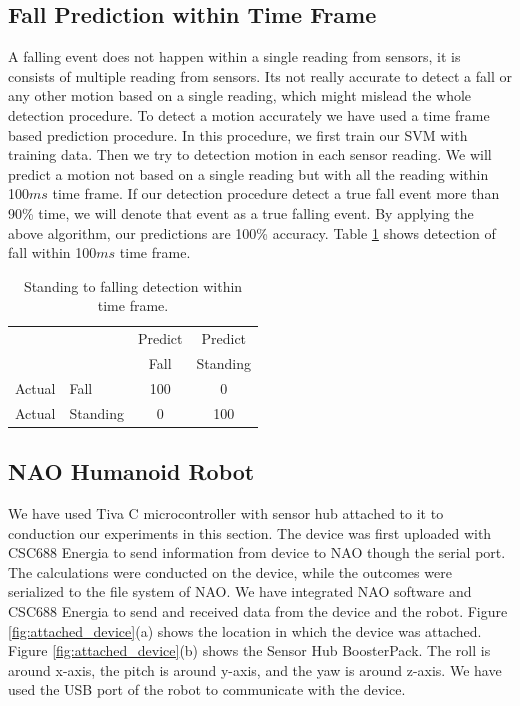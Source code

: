\documentclass[letterpaper]{article}
\begin{document}
\subsection*{Fall Prediction within Time Frame}

A falling event does not happen within a single reading from sensors, it is consists of multiple
reading from sensors.  Its not really accurate to detect a fall or any other motion based on a
single reading, which might mislead the whole detection procedure. To detect a motion accurately we
have used a time frame based prediction procedure. In this procedure, we first train our SVM with
training data. Then we try to detection motion in each sensor reading. We will predict a motion not
based on a single reading but with all the reading within 100$ms$ time frame. If our detection
procedure detect a true fall event more than 90\% time, we will denote that event as a true
falling event. By applying the above algorithm, our predictions are 100\% accuracy.
Table \ref{tab:StandingToFallingDetectionsvmframe} shows detection of fall within 100$ms$ time
frame.

\begin{table}[!ht]
\caption{Standing to falling detection within time frame.}
	\label{tab:StandingToFallingDetectionsvmframe}
	\centering
		\begin{tabular} {l l |c |c}
			& & Predict& Predict \\ 
			& & Fall & Standing \\ \hline
			Actual& Fall & 100 & 0\\ \hline
			Actual& Standing & 0& 100\\ \hline
		\end{tabular}
\end{table}

\subsection{NAO Humanoid Robot}

We have used Tiva C microcontroller with sensor hub attached to it to conduction our experiments in
this section. The device was first uploaded with CSC688 Energia to send information from device to
NAO though the serial port. The calculations were conducted on the device, while the outcomes were
serialized to the file system of NAO. We have integrated NAO software and CSC688 Energia to send and
received data from the device and the robot. Figure \ref{fig:attached_device}(a) shows the location
in which the device was attached. Figure \ref{fig:attached_device}(b) shows the Sensor Hub
BoosterPack. The roll is around x-axis, the pitch is around y-axis, and the yaw is around z-axis. 
We have used the USB port of the robot to communicate with the device.  
\end{document}
